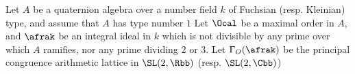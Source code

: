 


\begin{thm}
  Let $A$ be a quaternion algebra over a number field $k$ of Fuchsian (resp. Kleinian) type, and assume that $A$ has type number $1$ Let $\Ocal$ be a maximal order in $A$, and $\afrak$ be an integral ideal in $k$ which is not divisible by any prime over which $A$ ramifies, nor any prime dividing $2$ or $3$. Let $\Gamma_O(\afrak)$ be the principal congruence arithmetic lattice in $\SL(2,\Rbb)$ (resp. $\SL(2,\Cbb)$)
\end{thm}

